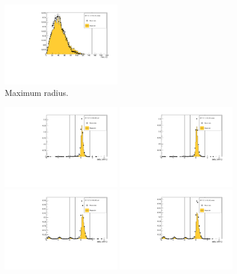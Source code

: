 \begin{figure}[!tbh]
    \includegraphics*[width=0.45\textwidth]{02-Cuts/Figures/2017-2.7_10-140_lH2_empty/tku_max_r_us_cut.pdf}
    \caption{Maximum radius.
\label{fig:tku_max_r}}
\end{figure}

\begin{figure}[!tbh]
    \centering
    \includegraphics*[width=0.45\textwidth]{02-Cuts/Figures/2017-2.7_3-140_lH2_full/tof_delta_tof01_us_cut.pdf}
    \includegraphics*[width=0.45\textwidth]{02-Cuts/Figures/2017-2.7_3-140_lH2_empty/tof_delta_tof01_us_cut.pdf}
    \includegraphics*[width=0.45\textwidth]{02-Cuts/Figures/2017-2.7_6-140_lH2_full/tof_delta_tof01_us_cut.pdf}
    \includegraphics*[width=0.45\textwidth]{02-Cuts/Figures/2017-2.7_6-140_lH2_empty/tof_delta_tof01_us_cut.pdf}

\end{figure}
